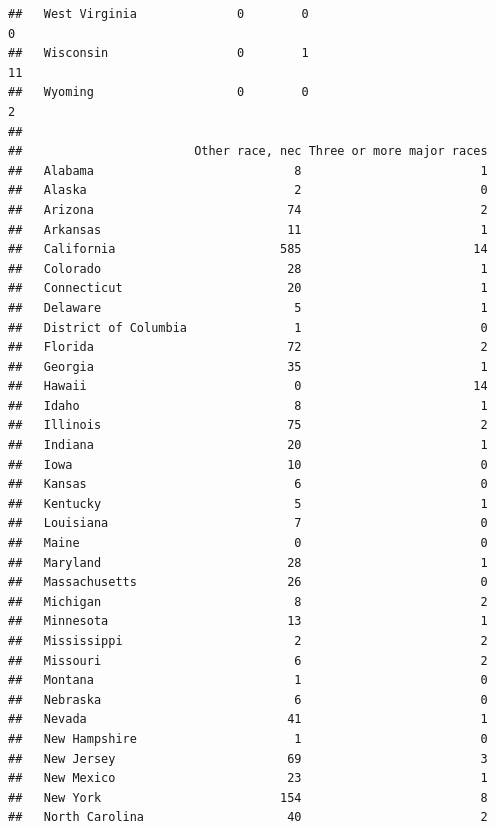 \documentclass[]{book}
\theoremstyle{definition}
\theoremstyle{definition}
\theoremstyle{definition}
\theoremstyle{remark}
\begin{document}
\begin{verbatim}
##   West Virginia              0        0                               0
##   Wisconsin                  0        1                              11
##   Wyoming                    0        0                               2
##                       
##                        Other race, nec Three or more major races
##   Alabama                            8                         1
##   Alaska                             2                         0
##   Arizona                           74                         2
##   Arkansas                          11                         1
##   California                       585                        14
##   Colorado                          28                         1
##   Connecticut                       20                         1
##   Delaware                           5                         1
##   District of Columbia               1                         0
##   Florida                           72                         2
##   Georgia                           35                         1
##   Hawaii                             0                        14
##   Idaho                              8                         1
##   Illinois                          75                         2
##   Indiana                           20                         1
##   Iowa                              10                         0
##   Kansas                             6                         0
##   Kentucky                           5                         1
##   Louisiana                          7                         0
##   Maine                              0                         0
##   Maryland                          28                         1
##   Massachusetts                     26                         0
##   Michigan                           8                         2
##   Minnesota                         13                         1
##   Mississippi                        2                         2
##   Missouri                           6                         2
##   Montana                            1                         0
##   Nebraska                           6                         0
##   Nevada                            41                         1
##   New Hampshire                      1                         0
##   New Jersey                        69                         3
##   New Mexico                        23                         1
##   New York                         154                         8
##   North Carolina                    40                         2

\end{verbatim}
\end{document}
